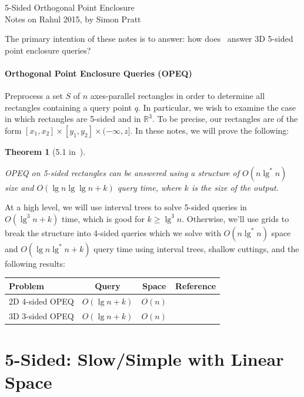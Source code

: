 \documentclass[letterpaper,12pt,twocolumn]{article}
\newcommand\lspace{\hspace{-0.5em}}
\newcommand{\BigOh}[1]{O\!\left(#1\right)}
\newcommand\IR{\mathbb{R}}
\newcommand\bounds[1]{[#1]}
\newcommand\lbounds[1]{(#1]} %
\theoremstyle{plain}
\newtheorem{theorem}{Theorem}
\begin{document}
{\noindent\Large 5-Sided Orthogonal Point Enclosure}\\
{\noindent Notes on Rahul 2015, by Simon Pratt}

The primary intention of these notes is to answer: how
does~\cite{rahul2015improved} answer 3D 5-sided point enclosure
queries?

\paragraph{Orthogonal Point Enclosure Queries (OPEQ)}
Preprocess a set $S$ of $n$ axes-parallel rectangles in order to
determine all rectangles containing a query point $q$.  In particular,
we wish to examine the case in which rectangles are 5-sided and in
$\IR^3$.  To be precise, our rectangles are of the form
$\bounds{x_1,x_2} \times \bounds{y_1, y_2} \times
\lbounds{-\infty,z}$.  In these notes, we will prove the following:

\begin{theorem}[5.1 in~\cite{rahul2015improved}]\label{thm:51}

  OPEQ on 5-sided rectangles can be answered using a structure of
  $\BigOh{n\lg^* n}$ size and $\BigOh{\lg n \lg\lg n + k}$ query time,
  where $k$ is the size of the output.

\end{theorem}

At a high level, we will use interval trees to solve 5-sided queries
in $\BigOh{\lg^3 n + k}$ time, which is good for $k \ge \lg^3 n$.
Otherwise, we'll use grids to break the structure into 4-sided queries
which we solve with $\BigOh{n\lg^* n}$ space and $\BigOh{\lg n\lg^* n
  + k}$ query time using interval trees, shallow cuttings, and the
following results:

\noindent\begin{tabular}{lccr}
    \toprule
    Problem & Query & Space & Reference \\
    \midrule
    2D 4-sided OPEQ & $\BigOh{\lg n + k}$ & $\BigOh{n}$ & \cite{chazelle1986filtering} \\ %
    3D 3-sided OPEQ & $\BigOh{\lg n + k}$ & $\BigOh{n}$ & \cite{afshani2008dominance} \\ %
    \bottomrule
\end{tabular}

\section{\lspace{} 5-Sided: Slow/Simple with Linear Space}
\label{sec:slow}
\end{document}
